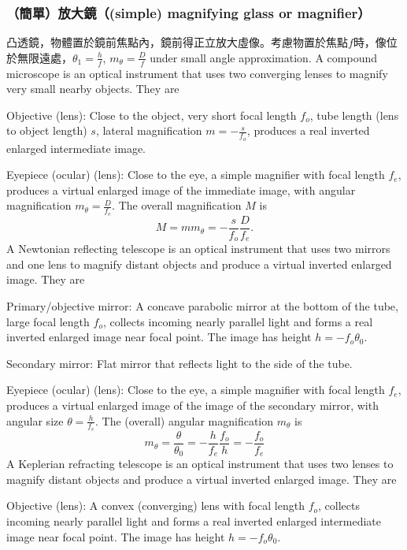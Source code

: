 \documentclass[a4paper,12pt]{report}
\begin{document}
\subsubsection{（簡單）放大鏡（(simple) magnifying glass or magnifier）}
凸透鏡，物體置於鏡前焦點內，鏡前得正立放大虛像。考慮物置於焦點$f$時，像位於無限遠處，$\theta_1=\frac{h}{f}$, $m_{\theta}=\frac{D}{f}$ under small angle approximation.
A compound microscope is an optical instrument that uses two converging lenses to magnify very small nearby objects. They are
\bit
\item Objective (lens): Close to the object, very short focal length $f_o$, tube length (lens to object length) $s$, lateral magnification $m=-\frac{s}{f_o}$, produces a real inverted enlarged intermediate image.
\item Eyepiece (ocular) (lens): Close to the eye, a simple magnifier with focal length $f_e$, produces a virtual enlarged image of the immediate image, with angular magnification $m_{\theta}=\frac{D}{f_e}$.
\eit
The overall magnification $M$ is
\[M=mm_{\theta}=-\frac{s}{f_o}\frac{D}{f_e}.\]
A Newtonian reflecting telescope is an optical instrument that uses two mirrors and one lens to magnify distant objects and produce a virtual inverted enlarged image. They are
\bit
\item Primary/objective mirror: A concave parabolic mirror at the bottom of the tube, large focal length $f_o$, collects incoming nearly parallel light and forms a real inverted enlarged image near focal point. The image has height $h=-f_o\theta_0$.
\item Secondary mirror: Flat mirror that reflects light to the side of the tube.
\item Eyepiece (ocular) (lens): Close to the eye, a simple magnifier with focal length $f_e$, produces a virtual enlarged image of the image of the secondary mirror, with angular size $\theta=\frac{h}{f_e}$.
\eit
The (overall) angular magnification $m_{\theta}$ is
\[m_{\theta}=\frac{\theta}{\theta_0}=-\frac{h}{f_e}\frac{f_o}{h}=-\frac{f_o}{f_e}\]
A Keplerian refracting telescope is an optical instrument that uses two lenses to magnify distant objects and produce a virtual inverted enlarged image. They are
\bit
\item Objective (lens): A convex (converging) lens with focal length $f_o$, collects incoming nearly parallel light and forms a real inverted enlarged intermediate image near focal point. The image has height $h=-f_o\theta_0$.
\end{document}
